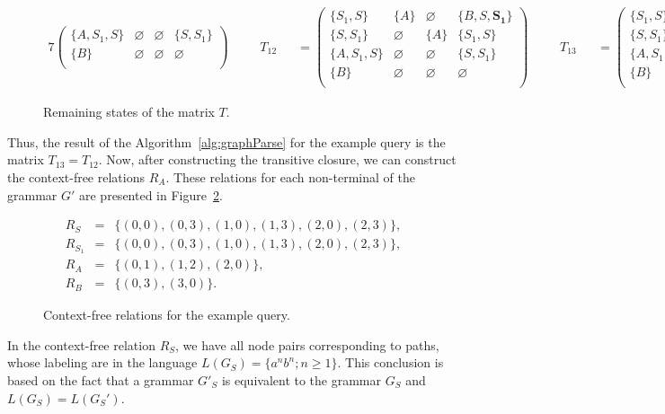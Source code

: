 \begin{figure}[ht]
\begin{alignat*}{7}
\begin{pmatrix}
\{A, S_1, S\}  & \varnothing & \varnothing & \{S, S_1\} \\
\{B\}       & \varnothing & \varnothing & \varnothing \\
\end{pmatrix} \ \ \ \ &&T_{12} &&= \begin{pmatrix}
\{S_1, S\}     & \{A\}       & \varnothing & \{B, S, \pmb{S_1}\}    \\
\{S, S_1\}       & \varnothing & \{A\}       & \{S_1, S\}     \\
\{A, S_1, S\}  & \varnothing & \varnothing & \{S, S_1\} \\
\{B\}       & \varnothing & \varnothing & \varnothing \\
\end{pmatrix} \ \ \ \ &&T_{13} &&= \begin{pmatrix}
\{S_1, S\}     & \{A\}       & \varnothing & \{B, S, S_1\}    \\
\{S, S_1\}       & \varnothing & \{A\}       & \{S_1, S\}     \\
\{A, S_1, S\}  & \varnothing & \varnothing & \{S, S_1\} \\
\{B\}       & \varnothing & \varnothing & \varnothing \\
\end{pmatrix}
\end{alignat*}
\caption{Remaining states of the matrix $T$.}
\label{ExampleQueryFinalIterations}
\end{figure}

Thus, the result of the Algorithm~\ref{alg:graphParse} for the example query is the matrix $T_{13} = T_{12}$. Now, after constructing the transitive closure, we can construct the context-free relations $R_A$. These relations for each non-terminal of the grammar $G'$ are presented in Figure~\ref{ExampleQueryCFRelations}.

\begin{figure}[h]
\begin{eqnarray*}
R_S&=&\{(0,0),(0,3),(1,0),(1,3),(2,0),(2,3)\},\\
R_{S_1}&=&\{(0,0),(0,3),(1,0),(1,3),(2,0),(2,3)\},\\
R_{A}&=&\{(0,1),(1,2),(2,0)\}, \\
R_{B}&=&\{(0,3), (3,0)\}.
\end{eqnarray*}
\caption{Context-free relations for the example query.}
\label{ExampleQueryCFRelations}
\end{figure}

In the context-free relation $R_S$, we have all node pairs corresponding to paths, whose labeling are in the language $L(G_S) = \{a^n b^n; n \geq 1\}$. This conclusion is based on the fact that a grammar $G'_S$ is equivalent to the grammar $G_S$ and $L(G_S) = L(G_S')$.
